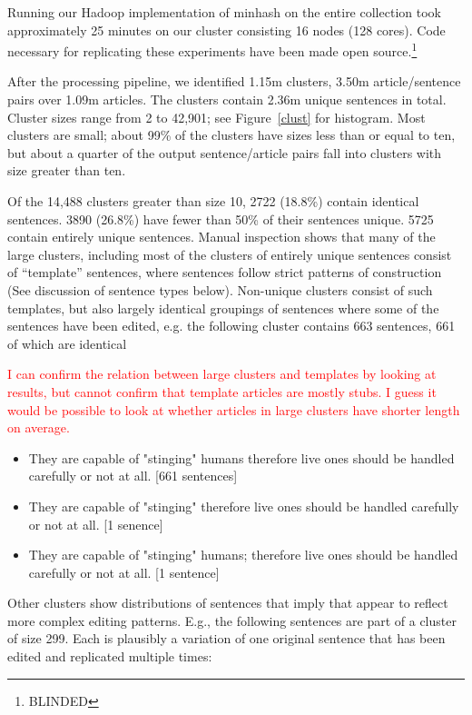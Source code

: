 \documentclass[letterpaper]{article}
\newcommand{\red}[1]{\textcolor{red}{#1}}
\begin{document}
Running our Hadoop implementation of minhash on the entire collection
took approximately 25 minutes on our cluster consisting 16 nodes (128
cores). Code necessary for replicating these experiments have been
made open source.\footnote{\small BLINDED}


After the processing pipeline, we identified 1.15m clusters, 3.50m
article/sentence pairs over 1.09m articles. The clusters contain 2.36m
unique sentences in total. Cluster sizes range from 2 to 42,901; see
Figure~\ref{clust} for histogram. Most clusters are small; about 99\%
of the clusters have sizes less than or equal to ten, but about a
quarter of the output sentence/article pairs fall into clusters with
size greater than ten. 

Of the 14,488 clusters greater than size 10, 2722 (18.8\%) contain
identical sentences. 3890 (26.8\%) have fewer than 50\% of their
sentences unique. 5725 contain entirely unique sentences. Manual
inspection shows that many of the large clusters, including most of
the clusters of entirely unique sentences consist of ``template''
sentences, where sentences follow strict patterns of construction (See
discussion of sentence types below). Non-unique clusters consist of
such templates, but also largely identical groupings of sentences
where some of the sentences have been edited, e.g. the following
cluster contains 663 sentences, 661 of which are identical

\red{I can confirm the relation between large clusters and templates by looking at results, but cannot confirm that template articles are mostly stubs. I guess it would be possible to look at whether articles in large clusters have shorter length on average.}

\begin{itemize}
\item They are capable of "stinging" humans therefore live ones should be handled carefully or not at all. [661 sentences]
\item They are capable of "stinging" therefore live ones should be handled carefully or not at all. [1 senence]
\item They are capable of "stinging" humans; therefore live ones should be handled carefully or not at all. [1 sentence]
\end{itemize}

Other clusters show distributions of sentences that imply that appear to reflect more complex editing patterns. E.g., the following sentences are part of a cluster of size 299. Each is plausibly a variation of one original sentence that has been edited and replicated multiple times:
\end{document}
